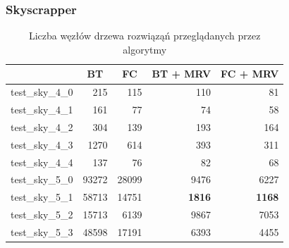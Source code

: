 \documentclass{article}
\begin{document}
	\subsubsection{Skyscrapper}
	
	\begin{table}[H]
		\caption{Liczba węzłów drzewa rozwiąząń przeglądanych przez algorytmy}
		\label{tab:skyscrapper_solutions}
		\begin{center}
			\begin{tabular}{|l|r|r|r|r|}
				\hline
				& \multicolumn{1}{c|}{\textbf{BT}} & \multicolumn{1}{c|}{\textbf{FC}} & \multicolumn{1}{c|}{\textbf{BT + MRV}} & \multicolumn{1}{c|}{\textbf{FC + MRV}} \\ \hline
				test\_sky\_4\_0 & 215                              & 115                              & 110                                    & 81                                     \\ \hline
				test\_sky\_4\_1 & 161                              & 77                               & 74                                     & 58                                     \\ \hline
				test\_sky\_4\_2 & 304                              & 139                              & 193                                    & 164                                    \\ \hline
				test\_sky\_4\_3 & 1270                             & 614                              & 393                                    & 311                                    \\ \hline
				test\_sky\_4\_4 & 137                              & 76                               & 82                                     & 68                                     \\ \hline
				test\_sky\_5\_0 & 93272                            & 28099                            & 9476                                   & 6227                                   \\ \hline
				test\_sky\_5\_1 & 58713                            & 14751                            & \textbf{1816}                          & \textbf{1168}                          \\ \hline
				test\_sky\_5\_2 & 15713                            & 6139                             & 9867                                   & 7053                                   \\ \hline
				test\_sky\_5\_3 & 48598                            & 17191                            & 6393                                   & 4455                                   \\ \hline

\end{tabular}
\end{center}
\end{table}
\end{document}
